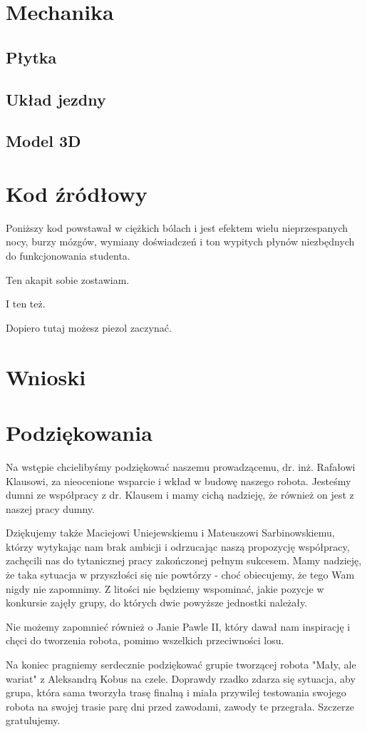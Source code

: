 \documentclass{article}
\begin{document}
\section{Mechanika}

\subsection{Płytka}


\subsection{Układ jezdny}


\subsection{Model 3D}

\section{Kod źródłowy}

Poniższy kod powstawał w ciężkich bólach i jest efektem wielu nieprzespanych nocy, burzy mózgów, wymiany doświadczeń i ton wypitych płynów niezbędnych do funkcjonowania studenta. 

Ten akapit sobie zostawiam.

I ten też.

Dopiero tutaj możesz piezol zaczynać.

\section{Wnioski}

\section{Podziękowania}

Na wstępie chcielibyśmy podziękować naszemu prowadzącemu, dr. inż. Rafałowi Klausowi,  za nieocenione wsparcie i wkład w budowę naszego robota. Jesteśmy dumni ze współpracy z dr. Klausem i mamy cichą nadzieję, że również on jest z naszej pracy dumny.

Dziękujemy także Maciejowi Uniejewskiemu i Mateuszowi Sarbinowskiemu, którzy  wytykając nam brak ambicji i odrzucając naszą propozycję współpracy, zachęcili nas do tytanicznej pracy zakończonej pełnym sukcesem. Mamy nadzieję, że taka sytuacja w przyszłości się nie powtórzy - choć obiecujemy, że tego Wam nigdy nie zapomnimy. Z litości nie będziemy wspominać, jakie pozycje w konkursie zajęły grupy, do których dwie powyższe jednostki należały.

Nie możemy zapomnieć również o Janie Pawle II, który dawał nam inspirację i chęci do tworzenia robota, pomimo wszelkich przeciwności losu.

Na koniec pragniemy serdecznie podziękować grupie tworzącej robota "Mały, ale wariat" z Aleksandrą Kobus na czele. Doprawdy rzadko zdarza się sytuacja, aby grupa, która sama tworzyła trasę finalną i miała przywilej testowania swojego robota na swojej trasie parę dni przed zawodami, zawody te przegrała. Szczerze gratulujemy.


\end{document}
